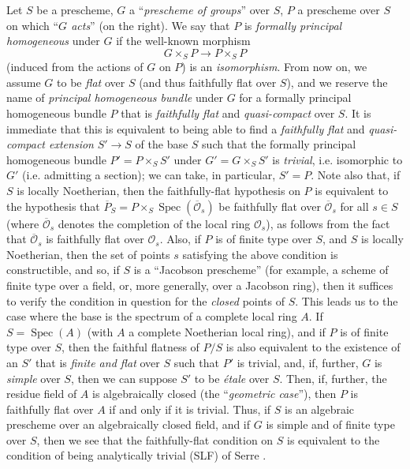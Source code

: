\documentclass{article}
\newcommand{\scr}[1]{{\mathscr{#1}}}
\DeclareMathOperator{\Spec}{Spec}
\newcommand{\oldpage}[1]{\marginpar{\footnotesize$\Big\vert$ \textit{p.~#1}}}
\begin{document}
Let $S$ be a prescheme, $G$ a ``\emph{prescheme of groups}'' over $S$, $P$ a prescheme over $S$ on which ``\emph{$G$ acts}'' (on the right).
We say that $P$ is \emph{formally principal homogeneous} under $G$ if the well-known morphism
\[
  G\times_S P \to P\times_S P
\]
\oldpage{190-27}
(induced from the actions of $G$ on $P$) is an \emph{isomorphism}.
From now on, we assume $G$ to be \emph{flat} over $S$ (and thus faithfully flat over $S$), and we reserve the name of \emph{principal homogeneous bundle} under $G$ for a formally principal homogeneous bundle $P$ that is \emph{faithfully flat} and \emph{quasi-compact} over $S$.
It is immediate that this is equivalent to being able to find a \emph{faithfully flat} and \emph{quasi-compact extension} $S'\to S$ of the base $S$ such that the formally principal homogeneous bundle $P'=P\times_S S'$ under $G'=G\times_S S'$ is \emph{trivial}, i.e. isomorphic to $G'$ (i.e. admitting a section);
we can take, in particular, $S'=P$.
Note also that, if $S$ is locally Noetherian, then the faithfully-flat hypothesis on $P$ is equivalent to the hypothesis that $\overline{P}_S=P\times_S\Spec(\overline{\scr{O}}_s)$ be faithfully flat over $\overline{\scr{O}}_s$ for all $s\in S$ (where $\overline{\scr{O}}_s$ denotes the completion of the local ring $\scr{O}_s$), as follows from the fact that $\overline{\scr{O}}_s$ is faithfully flat over $\scr{O}_s$.
Also, if $P$ is of finite type over $S$, and $S$ is locally Noetherian, then the set of points $s$ satisfying the above condition is constructible, and so, if $S$ is a ``Jacobson prescheme'' (for example, a scheme of finite type over a field, or, more generally, over a Jacobson ring), then it suffices to verify the condition in question for the \emph{closed} points of $S$.
This leads us to the case where the base is the spectrum of a complete local ring $A$.
If $S=\Spec(A)$ (with $A$ a complete Noetherian local ring), and if $P$ is of finite type over $S$, then the faithful flatness of $P/S$ is also equivalent to the existence of an $S'$ that is \emph{finite and flat} over $S$ such that $P'$ is trivial, and, if, further, $G$ is \emph{simple} over $S$, then we can suppose $S'$ to be \emph{\'{e}tale} over $S$.
Then, if, further, the residue field of $A$ is algebraically closed (the ``\emph{geometric case}''), then $P$ is faithfully flat over $A$ if and only if it is trivial.
Thus, if $S$ is an algebraic prescheme over an algebraically closed field, and if $G$ is simple and of finite type over $S$, then we see that the faithfully-flat condition on $S$ is equivalent to the condition of being analytically trivial (SLF) of Serre \cite[p.~1--12]{6}.
\end{document}
